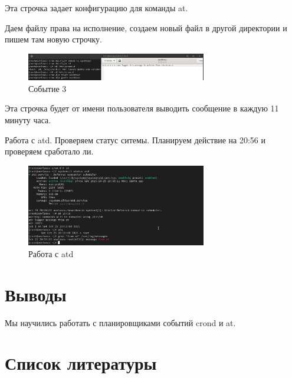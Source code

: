 \documentclass[
  12pt,
  a4paper,
  DIV=11,
  numbers=noendperiod]{scrreprt}
\begin{document}
Эта строчка задает конфигурацию для команды at.

Даем файлу права на исполнение, создаем новый файл в другой директории и
пишем там новую строчку.

\begin{figure}

{\centering \includegraphics[width=0.7\textwidth,height=\textheight]{image/6.png}

}

\caption{Событие 3}

\end{figure}%

Эта строчка будет от имени пользователя выводить сообщение в каждую 11
минуту часа.

Работа с atd. Проверяем статус ситемы. Планируем действие на 20:56 и
проверяем сработало ли.

\begin{figure}

{\centering \includegraphics[width=0.7\textwidth,height=\textheight]{image/7.png}

}

\caption{Работа с atd}

\end{figure}%

\chapter{Выводы}\label{ux432ux44bux432ux43eux434ux44b}

Мы научились работать с планировщиками событий crond и at.

\chapter*{Список
литературы}\label{ux441ux43fux438ux441ux43eux43a-ux43bux438ux442ux435ux440ux430ux442ux443ux440ux44b}

\printbibliography[heading=none]
\end{document}
